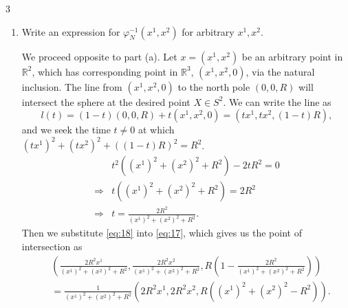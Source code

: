 \documentclass[11pt]{article}
\begin{document}
\begin{problem}{3}
\begin{enumerate}[label=(\alph*)]
\begin{proof}
\begin{equation}
			      \end{equation}
			      so that
			      \begin{equation}
				      \label{eq:16}
				      \varphi_N(X^1, X^2, X^3) = \left( \frac{X^1}{1 - X^3/R}, \frac{X^2}{1 - X^3/R} \right),
			      \end{equation}
			      as desired.
		      \end{proof}
		\item Write an expression for \(\varphi^{-1}_N(x^{1}, x^2)\) for arbitrary \( x^1, x^2 \).
		      \begin{answer}
			      We proceed opposite to part (a).
			      Let \( x = (x^1, x^2) \) be an arbitrary point in \( \mathbb{R}^2 \), which has corresponding point in \( \mathbb{R}^3 \), \( (x^1, x^2, 0) \), via the natural inclusion.
			      The line from \( (x^1, x^2, 0) \) to the north pole \( (0,0,R) \) will intersect the sphere at the desired point \( X \in S^2 \).
			      We can write the line as
			      \begin{equation}
				      \label{eq:17}
				      l(t) = (1-t)(0,0,R) + t(x^1, x^2, 0) = (tx^1, tx^2, (1-t)R),
			      \end{equation}
			      and we seek the time \( t \neq 0 \) at which \( (tx^1)^2 + (tx^2)^2 + ((1-t)R)^2 = R^2 \).
			      \begin{equation}
				      \label{eq:18}
				      \begin{aligned}
					                  & t^2 ((x^1)^2 + (x^2)^2 + R^2) - 2tR^2= 0  \\
					      \Rightarrow & t((x^1)^2 + (x^2)^2 + R^2) = 2R^2         \\
					      \Rightarrow & t = \frac{2R^2}{(x^1)^2 + (x^2)^2 + R^2}.
				      \end{aligned}
			      \end{equation}
			      Then we substitute \cref{eq:18} into \cref{eq:17}, which gives us the point of intersection as
			      \begin{equation}
				      \label{eq:19}
				      \begin{aligned}
					       & \left( \frac{2R^2 x^1}{(x^1)^2 + (x^2)^2 + R^2}, \frac{2 R^2 x^2}{(x^1)^2 + (x^2)^2 + R^2}, R(1 - \frac{2R^2}{(x^1)^2 + (x^2)^2 + R^2}) \right) \\
					       & = \frac{1}{(x^1)^2 + (x^2)^2 + R^2}\left( 2R^2x^1, 2R^2x^2, R((x^1)^2 + (x^2)^2 - R^2) \right).
				      \end{aligned}
			      \end{equation}

\end{answer}
\end{enumerate}
\end{problem}
\end{document}
